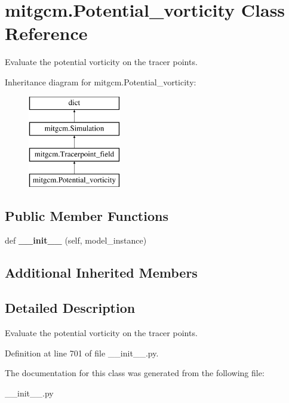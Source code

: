 \hypertarget{classmitgcm_1_1Potential__vorticity}{}\section{mitgcm.\+Potential\+\_\+vorticity Class Reference}
\label{classmitgcm_1_1Potential__vorticity}


Evaluate the potential vorticity on the tracer points.  


Inheritance diagram for mitgcm.\+Potential\+\_\+vorticity\+:\begin{figure}[H]
\begin{center}
\leavevmode
\includegraphics[height=4.000000cm]{classmitgcm_1_1Potential__vorticity}
\end{center}
\end{figure}
\subsection*{Public Member Functions}
\begin{DoxyCompactItemize}
\item 
\hypertarget{classmitgcm_1_1Potential__vorticity_af4a8a712b615e661870a9cd7a3b5e4ce}{}def {\bfseries \+\_\+\+\_\+init\+\_\+\+\_\+} (self, model\+\_\+instance)\label{classmitgcm_1_1Potential__vorticity_af4a8a712b615e661870a9cd7a3b5e4ce}

\end{DoxyCompactItemize}
\subsection*{Additional Inherited Members}


\subsection{Detailed Description}
Evaluate the potential vorticity on the tracer points. 



Definition at line 701 of file \+\_\+\+\_\+init\+\_\+\+\_\+.\+py.



The documentation for this class was generated from the following file\+:\begin{DoxyCompactItemize}
\item 
\+\_\+\+\_\+init\+\_\+\+\_\+.\+py\end{DoxyCompactItemize}
